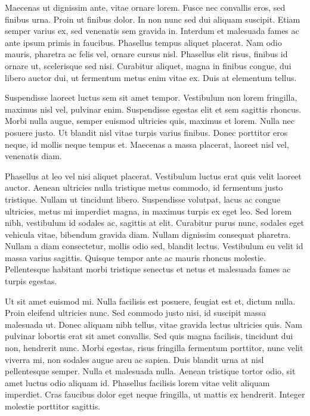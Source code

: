 Maecenas ut dignissim ante, vitae ornare lorem. Fusce nec convallis eros, sed finibus urna. Proin ut finibus dolor. In non nunc sed dui aliquam suscipit. Etiam semper varius ex, sed venenatis sem gravida in. Interdum et malesuada fames ac ante ipsum primis in faucibus. Phasellus tempus aliquet placerat. Nam odio mauris, pharetra ac felis vel, ornare cursus nisl. Phasellus elit risus, finibus id ornare ut, scelerisque sed nisi. Curabitur aliquet, magna in finibus congue, dui libero auctor dui, ut fermentum metus enim vitae ex. Duis at elementum tellus.

Suspendisse laoreet luctus sem sit amet tempor. Vestibulum non lorem fringilla, maximus nisl vel, pulvinar enim. Suspendisse egestas elit et sem sagittis rhoncus. Morbi nulla augue, semper euismod ultricies quis, maximus et lorem. Nulla nec posuere justo. Ut blandit nisl vitae turpis varius finibus. Donec porttitor eros neque, id mollis neque tempus et. Maecenas a massa placerat, laoreet nisl vel, venenatis diam.

Phasellus at leo vel nisi aliquet placerat. Vestibulum luctus erat quis velit laoreet auctor. Aenean ultricies nulla tristique metus commodo, id fermentum justo tristique. Nullam ut tincidunt libero. Suspendisse volutpat, lacus ac congue ultricies, metus mi imperdiet magna, in maximus turpis ex eget leo. Sed lorem nibh, vestibulum id sodales ac, sagittis at elit. Curabitur purus nunc, sodales eget vehicula vitae, bibendum gravida diam. Nullam dignissim consequat pharetra. Nullam a diam consectetur, mollis odio sed, blandit lectus. Vestibulum eu velit id massa varius sagittis. Quisque tempor ante ac mauris rhoncus molestie. Pellentesque habitant morbi tristique senectus et netus et malesuada fames ac turpis egestas.

Ut sit amet euismod mi. Nulla facilisis est posuere, feugiat est et, dictum nulla. Proin eleifend ultricies nunc. Sed commodo justo nisi, id suscipit massa malesuada ut. Donec aliquam nibh tellus, vitae gravida lectus ultricies quis. Nam pulvinar lobortis erat sit amet convallis. Sed quis magna facilisis, tincidunt dui non, hendrerit nunc. Morbi egestas, risus fringilla fermentum porttitor, nunc velit viverra mi, non sodales augue arcu ac sapien. Duis blandit urna at nisl pellentesque semper. Nulla et malesuada nulla. Aenean tristique tortor odio, sit amet luctus odio aliquam id. Phasellus facilisis lorem vitae velit aliquam imperdiet. Cras faucibus dolor eget neque fringilla, ut mattis ex hendrerit. Integer molestie porttitor sagittis.

